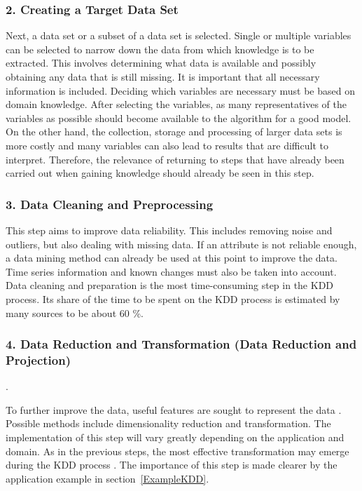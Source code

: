\subsubsection{2. Creating a Target Data Set}

Next, a data set or a subset of a data set is selected. Single or multiple variables can be selected to narrow down the data from which knowledge is to be extracted. \cite{Fayyad:1996} This involves determining what data is available and possibly obtaining any data that is still missing. It is important that all necessary information is included. Deciding which variables are necessary must be based on domain knowledge. After selecting the variables, as many representatives of the variables as possible should become available to the algorithm for a good model. On the other hand, the collection, storage and processing of larger data sets is more costly and many variables can also lead to results that are difficult to interpret. Therefore, the relevance of returning to steps that have already been carried out when gaining knowledge should already be seen in this step.\cite{Maimon:2010}

\subsubsection{3. Data Cleaning and Preprocessing}

This step aims to improve data reliability. This includes removing noise and outliers, but also dealing with missing data. If an attribute is not reliable enough, a data mining method can already be used at this point to improve the data.\cite{Maimon:2010} Time series information and known changes must also be taken into account. \cite{Kurgan:2006} Data cleaning and preparation is the most time-consuming step in the KDD process. Its share of the time to be spent on the KDD process is estimated by many sources to be about 60 \%.\cite{Kurgan:2006}

\subsubsection{4. Data Reduction and Transformation (Data Reduction and Projection)}.

To further improve the data, useful features are sought to represent the data \cite{Fayyad:1996}. Possible methods include dimensionality reduction and transformation. The implementation of this step will vary greatly depending on the application and domain. As in the previous steps, the most effective transformation may emerge during the KDD process \cite{Maimon:2010}. The importance of this step is made clearer by the application example in section~\ref{ExampleKDD}.


